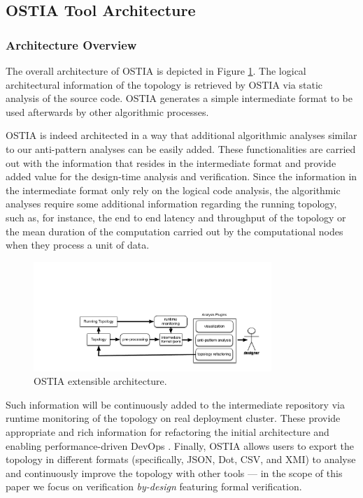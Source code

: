 \subsection{OSTIA Tool Architecture}

\subsubsection{Architecture Overview}

The overall architecture of OSTIA is depicted in
Figure \ref{archostia}. The logical architectural information of the
topology is retrieved by OSTIA via static analysis of the source code. OSTIA
generates a simple intermediate format to be used afterwards by other algorithmic
processes.

OSTIA is indeed architected in a way that additional algorithmic analyses similar to our anti-pattern
analyses can be easily added. These functionalities are carried out with the information that resides in the
intermediate format and provide added value for the design-time analysis and verification. Since the information in the intermediate format only rely
on the logical code analysis, the algorithmic analyses require some additional
information regarding the running topology, such as, for instance, the end to end latency and
throughput of the topology or the mean duration of the computation carried out by the computational nodes when they process a unit of data.

\begin{figure}[H]
	\begin{center}
		\includegraphics[width=9cm,draft]{images/fig1}
		\caption{OSTIA extensible architecture.}\label{archostia}
	\end{center}
\end{figure}

Such information will be continuously added to the intermediate repository via
runtime monitoring of the topology on real deployment cluster. These provide
appropriate and rich information for refactoring the initial architecture and
enabling performance-driven DevOps \cite{brunnert2015performance}.
Finally, OSTIA allows users to export the topology in different formats
(specifically, JSON, Dot, CSV, and XMI) to analyse and continuously improve the topology with other tools --- in the scope of this paper we focus on verification \emph{by-design} featuring formal verification.

